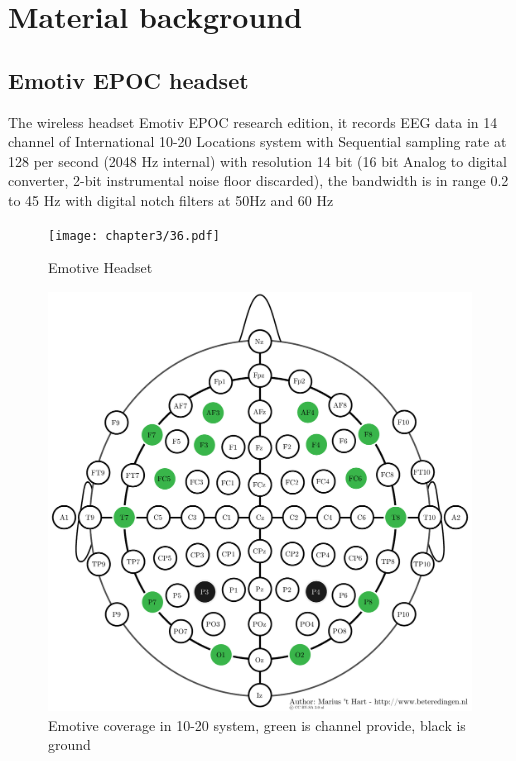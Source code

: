 \newpage
\section{Material background}

\subsection{Emotiv EPOC headset\cite{ref12}}

\hspace{1.5cm} The wireless headset Emotiv EPOC research edition, it records EEG data in 14 channel of International 10-20 Locations system with Sequential sampling rate at 128 per second (2048 Hz internal) with resolution 14 bit (16 bit Analog to digital converter, 2-bit instrumental noise floor discarded), the bandwidth is in range 0.2 to 45 Hz with digital notch filters at 50Hz and 60 Hz

\begin{figure}[ht]
	\centering
	\texttt{[image: chapter3/36.pdf]}
	\caption{Emotive Headset}
\end{figure}

\begin{figure}[ht]
	\centering
	\includegraphics[scale = 0.5]{chapter3/emotiv_electrodes_cover.pdf}
	\caption{Emotive coverage in 10-20 system, green is channel provide, black is ground}
\end{figure}

